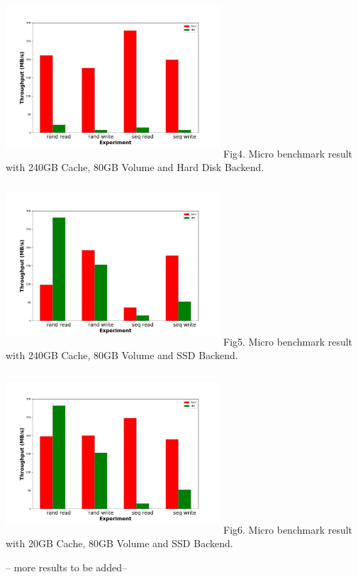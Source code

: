\includegraphics[width=8cm, height=6cm]{graphs/request_bw_hdd_240gb.png}
Fig4. Micro benchmark result with 240GB Cache, 80GB Volume and Hard Disk Backend.


\includegraphics[width=8cm, height=6cm]{graphs/request_bw_ssd_20gb.png}
Fig5. Micro benchmark result with 240GB Cache, 80GB Volume and SSD Backend.


\includegraphics[width=8cm, height=6cm]{graphs/request_bw_ssd_240gb.png}
Fig6. Micro benchmark result with 20GB Cache, 80GB Volume and SSD Backend.

-- more results to be added--







